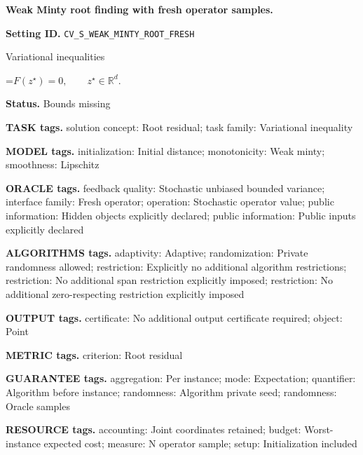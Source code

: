 \documentclass[10pt,a4paper]{article}
\newcommand{\AtlasMath}[1]{\par\begingroup\centering\setbox0=\hbox{$\displaystyle #1$}\ifdim\wd0>1.4\linewidth\typeout{ATLAS WIDE FORMULA: \the\wd0}\fi\ifdim\wd0>\linewidth\resizebox{\linewidth}{!}{\box0}\else\box0\fi\par\endgroup}
\begin{document}
\raggedright

{\LARGE\bfseries\sffamily\color{AtlasNavy} Weak Minty root finding with fresh operator samples.\par}\vspace{5pt}


\textbf{Setting ID.} \texttt{CV\_\allowbreak{}S\_\allowbreak{}WEAK\_\allowbreak{}MINTY\_\allowbreak{}ROOT\_\allowbreak{}FRESH}



Variational inequalities




\AtlasMath{F(z^\star)=0,\qquad z^\star\in\mathbb{R}^d.}




\textbf{Status.} Bounds missing



\textbf{TASK tags.} solution concept: Root residual; task family: Variational inequality



\textbf{MODEL tags.} initialization: Initial distance; monotonicity: Weak minty; smoothness: Lipschitz



\textbf{ORACLE tags.} feedback quality: Stochastic unbiased bounded variance; interface family: Fresh operator; operation: Stochastic operator value; public information: Hidden objects explicitly declared; public information: Public inputs explicitly declared



\textbf{ALGORITHMS tags.} adaptivity: Adaptive; randomization: Private randomness allowed; restriction: Explicitly no additional algorithm restrictions; restriction: No additional span restriction explicitly imposed; restriction: No additional zero-respecting restriction explicitly imposed



\textbf{OUTPUT tags.} certificate: No additional output certificate required; object: Point



\textbf{METRIC tags.} criterion: Root residual



\textbf{GUARANTEE tags.} aggregation: Per instance; mode: Expectation; quantifier: Algorithm before instance; randomness: Algorithm private seed; randomness: Oracle samples



\textbf{RESOURCE tags.} accounting: Joint coordinates retained; budget: Worst-instance expected cost; measure: N operator sample; setup: Initialization included
\end{document}
